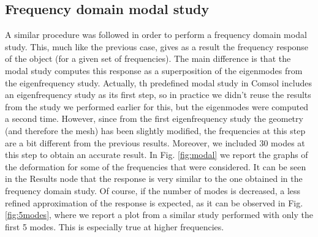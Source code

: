\documentclass[a4paper]{article}
\begin{document}
\subsection{Frequency domain modal study}
A similar procedure was followed in order to perform a frequency domain modal study. This, much like the previous case, gives as a result the frequency response of the object (for a given set of frequencies). The main difference is that the modal study computes this response as a superposition of the eigenmodes from the eigenfrequency study. Actually, th predefined modal study in Comsol includes an eigenfrequency study as its first step, so in practice we didn't reuse the results from the study we performed earlier for this, but the eigenmodes were computed a second time. However, since from the first eigenfrequency study the geometry (and therefore the mesh) has been slightly modified, the frequencies at this step are a bit different from the previous results. Moreover, we included 30 modes at this step to obtain an accurate result. In Fig. \ref{fig:modal} we report the graphs of the deformation for some of the frequencies that were considered. It can be seen in the Results node that the response is very similar to the one obtained in the frequency domain study. Of course, if the number of modes is decreased, a less refined approximation of the response is expected, as it can be observed in Fig. \ref{fig:5modes}, where we report a plot from a similar study performed with only the first 5 modes. This is especially true at higher frequencies.
\end{document}
